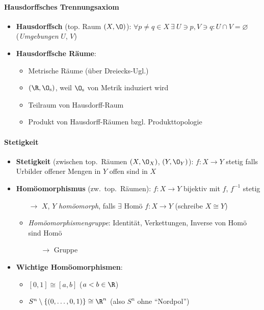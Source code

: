 \paragraph{Hausdorffsches Trennungsaxiom}
\begin{itemize}
  \item \textbf{Hausdorffsch} (top. Raum \( (X, \O) \)): \( \forall p \neq q \in X \ \exists \  U \ni p, V \ni q : U \cap V = \varnothing \) (\emph{Umgebungen} \( U \), \( V \)) 
  \item \textbf{Hausdorffsche Räume}:
  \begin{itemize}
    \item Metrische Räume (über Dreiecks-Ugl.)
    \item \( (\R, \O_{\text{s}}) \), weil \( \O_{\text{s}} \) von Metrik induziert wird
    \item Teilraum von Hausdorff-Raum
    \item Produkt von Hausdorff-Räumen bzgl. Produkttopologie
  \end{itemize}
\end{itemize}

\paragraph{Stetigkeit}
\begin{itemize}
  \item \textbf{Stetigkeit} (zwischen top.\ Räumen \( (X,\O_X) \), \( (Y, \O_Y) \)): \( f: X \to Y \) stetig falls Urbilder offener Mengen in \( Y \) offen sind in \( X \)
  \item \textbf{Homöomorphismus} (zw.\ top.\ Räumen): \( f: X \to Y \) bijektiv mit \( f \), \( f^{-1} \) stetig
  \begin{itemize}
    \item[\( \to \)] \( X \), \( Y \) \emph{homöomorph}, falls \( \exists \) Homö \( f: X \to Y \) (schreibe \( X \cong Y \))
    \item \emph{Homöomorphismengruppe}: Identität, Verkettungen, Inverse von Homö sind Homö
    \begin{itemize}
      \item[\( \to \)] Gruppe
    \end{itemize}
  \end{itemize}
  \item \textbf{Wichtige Homöomorphismen}: 
  \begin{itemize}
    \item \( [0,1] \cong [a,b] \) (\( a < b \in \R \))
    \item \( S^n \setminus \left \{ \left( 0,\dots,0,1 \right) \right \} \cong \R^n \) (also \( S^n \) ohne ``Nordpol'')
  \end{itemize}
\end{itemize}

